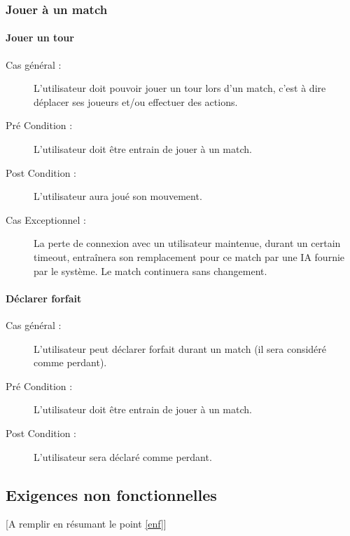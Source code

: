 \documentclass[a4paper]{article}
\begin{document}
\subsubsection{Jouer à un match}
\paragraph{Jouer un tour}
\begin{description}
    \item[Cas général :] L'\gls{utilisateur} doit pouvoir jouer un tour lors d'un match, c'est à dire déplacer ses \glspl{joueur} et/ou effectuer des actions.
    \item[Pré Condition  :] L'\gls{utilisateur} doit être entrain de jouer à un match.
    \item[Post Condition :] L'\gls{utilisateur} aura joué son mouvement.
    \item[Cas Exceptionnel :] La perte de connexion avec un \gls{utilisateur} maintenue, durant un certain timeout, entraînera son remplacement pour ce match par une IA fournie par le système. Le match continuera sans changement.
\end{description}
\paragraph{Déclarer forfait}
\begin{description}
\item[Cas général :] L'\gls{utilisateur} peut déclarer forfait durant un match (il sera considéré comme perdant).
\item[Pré Condition  :] L'\gls{utilisateur} doit être entrain de jouer à un match.
\item[Post Condition :] L'\gls{utilisateur} sera déclaré comme perdant.
\end{description}


\subsection{Exigences non fonctionnelles}
[A remplir en résumant le point \ref{enf}]

\end{document}

